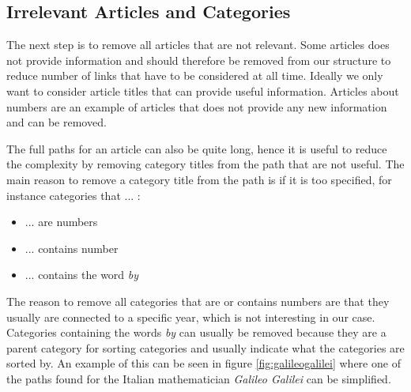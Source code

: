 \subsection{Irrelevant Articles and Categories}
The next step is to remove all articles that are not relevant. Some articles does not provide information and should therefore be removed from our structure to reduce number of links that have to be considered at all time. Ideally we only want to consider article titles that can provide useful information. Articles about numbers are an example of articles that does not provide any new information and can be removed. 

The full paths for an article can also be quite long, hence it is useful to reduce the complexity by removing category titles from the path that are not useful. The main reason to remove a category title from the path is if it is too specified, for instance categories that ... : 




\begin{itemize}
\item ... are numbers
\item ... contains number
\item ... contains the word \emph{by}
\end{itemize}

The reason to remove all categories that are or contains numbers are that they usually are connected to a specific year, which is not interesting in our case. Categories containing the words \emph{by} can usually be removed because they are a parent category for sorting categories and usually indicate what the categories are sorted by. 
An example of this can be seen in figure \ref{fig:galileogalilei} where one of the paths found for the Italian mathematician \emph{Galileo Galilei} can be simplified. 

